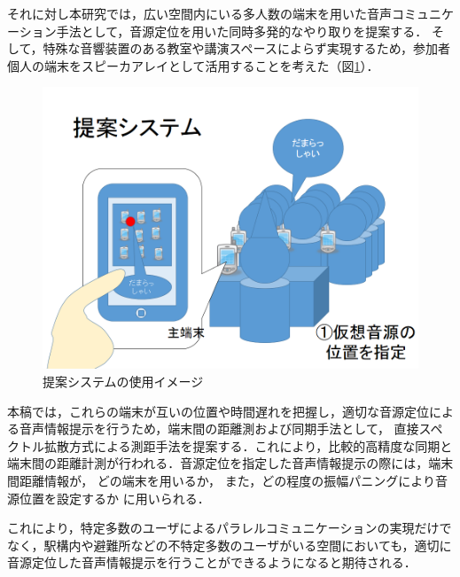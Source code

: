 それに対し本研究では，広い空間内にいる多人数の端末を用いた音声コミュニケーション手法として，音源定位を用いた同時多発的なやり取りを提案する．
そして，特殊な音響装置のある教室や講演スペースによらず実現するため，参加者個人の端末をスピーカアレイとして活用することを考えた（図\ref{fig:shikumi1}）．


\begin{figure}[p]
  \centering
  \includegraphics[clip,width=1.05\hsize]{img/shikumi1.png}
  \caption{提案システムの使用イメージ}\label{fig:shikumi1}
\end{figure}


本稿では，これらの端末が互いの位置や時間遅れを把握し，適切な音源定位による音声情報提示を行うため，端末間の距離測および同期手法として，
直接スペクトル拡散方式による測距手法を提案する．これにより，比較的高精度な同期と端末間の距離計測が行われる．音源定位を指定した音声情報提示の際には，端末間距離情報が，
どの端末を用いるか，
また，どの程度の振幅パニングにより音源位置を設定するか
に用いられる．

これにより，特定多数のユーザによるパラレルコミュニケーションの実現だけでなく，駅構内や避難所などの不特定多数のユーザがいる空間においても，適切に音源定位した音声情報提示を行うことができるようになると期待される．



\clearpage

